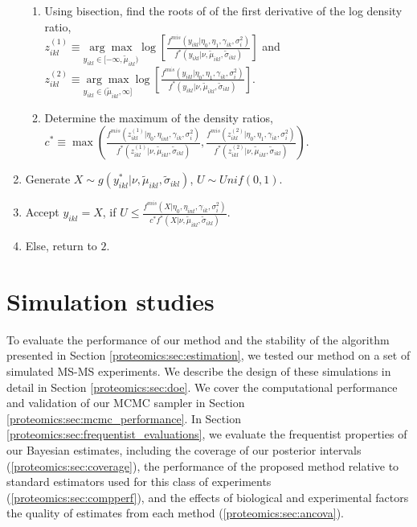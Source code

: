 \begin{algorithm}
\begin{enumerate}
\begin{enumerate}
\item Using bisection, find the roots of of the first derivative of the
log density ratio, \\
$z_{ikl}^{(1)}\equiv\underset{y_{ikl}\in[-\infty,\tilde{\mu}_{ikl})}{\arg\max}\log\left[\frac{f^{mis}(y_{ikl}\vert\eta_{0},\eta_{1},\gamma_{ik},\sigma_{i}^{2})}{f^*(y_{ikl}\vert\nu,\tilde{\mu}_{ikl},\tilde{\sigma}_{ikl})}\right]$
and $z_{ikl}^{(2)}\equiv\underset{y_{ikl}\in(\tilde{\mu}_{ikl},\infty]}{\arg\max}\log\left[\frac{f^{mis}(y_{ikl}\vert\eta_{0},\eta_{1},\gamma_{ik},\sigma_{i}^{2})}{f^*(y_{ikl}\vert\nu,\tilde{\mu}_{ikl},\tilde{\sigma}_{ikl})}\right]$.
\item Determine the maximum of the density ratios,\\
 $c^* \equiv \max\left(\frac{f^{mis}(z_{ikl}^{(1)}\vert\eta_{0},\eta_{int},\gamma_{ik},\sigma_{i}^{2})}{f^*(z_{ikl}^{(1)}\vert\nu,\tilde{\mu}_{ikl},\tilde{\sigma}_{ikl})},\frac{f^{mis}(z_{ikl}^{(2)}\vert\eta_{0},\eta_{1},\gamma_{ik},\sigma_{i}^{2})}{f^*(z_{ikl}^{(2)}\vert\nu,\tilde{\mu}_{ikl},\tilde{\sigma}_{ikl})}\right)$.
\end{enumerate}
\item Generate $X\sim g(y_{ikl}^{*}\vert\nu,\tilde{\mu}_{ikl},\tilde{\sigma}_{ikl})$,
$U\sim Unif(0,1)$.
\item Accept $y_{ikl}=X$, if $U\leq\frac{f^{mis}(X\vert\eta_{0},\eta_{int},\gamma_{ik},\sigma_{i}^{2})}{c^* f^*(X\vert\nu,\tilde{\mu}_{ikl},\tilde{\sigma}_{ikl})}$.
\item Else, return to $2$.\end{enumerate}
\end{algorithm}




\section{Simulation studies}
\label{proteomics:sec:simulations}

To evaluate the performance of our method and the stability of the algorithm presented in Section \ref{proteomics:sec:estimation}, we tested our method on a set of simulated MS-MS experiments.
We describe the design of these simulations in detail in Section \ref{proteomics:sec:doe}.
We cover the computational performance and validation of our MCMC sampler in Section \ref{proteomics:sec:mcmc_performance}.
In Section \ref{proteomics:sec:frequentist_evaluations}, we evaluate the frequentist properties of our Bayesian estimates, including the coverage of our posterior intervals (\ref{proteomics:sec:coverage}), the performance of the proposed method relative to standard estimators used for this class of experiments (\ref{proteomics:sec:compperf}), and the effects of biological and experimental factors the quality of estimates from each method (\ref{proteomics:sec:ancova}).

